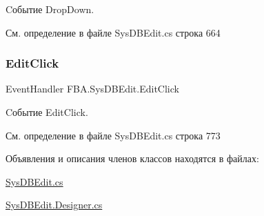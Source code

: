 Cобытие Drop\+Down. 



См. определение в файле Sys\+D\+B\+Edit.\+cs строка 664

\mbox{\label{class_f_b_a_1_1_sys_d_b_edit_a0c20f52d875a08e8847539a8c5a6181e}} 
\subsubsection{\texorpdfstring{Edit\+Click}{EditClick}}
{\footnotesize\ttfamily Event\+Handler F\+B\+A.\+Sys\+D\+B\+Edit.\+Edit\+Click}



Cобытие Edit\+Click. 



См. определение в файле Sys\+D\+B\+Edit.\+cs строка 773



Объявления и описания членов классов находятся в файлах\+:\begin{DoxyCompactItemize}
\item 
\mbox{\hyperlink{_sys_d_b_edit_8cs}{Sys\+D\+B\+Edit.\+cs}}\item 
\mbox{\hyperlink{_sys_d_b_edit_8_designer_8cs}{Sys\+D\+B\+Edit.\+Designer.\+cs}}\end{DoxyCompactItemize}
